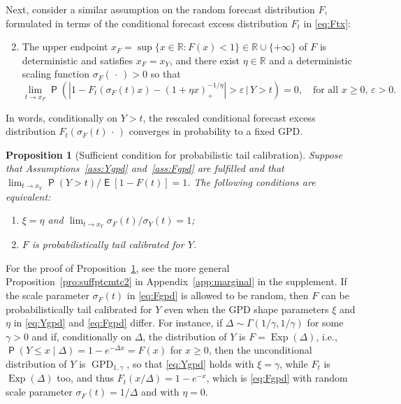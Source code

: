 \documentclass[12pt]{article}
\newcommand{\E}{\operatorname{\mathsf{E}}}
\newcommand{\Q}{\operatorname{\mathsf{P}}}
\newcommand{\R}{\mathbb{R}}
\newcommand{\GPD}{\operatorname{GPD}} %
\newcommand{\Exp}{\operatorname{Exp}} %
\newcommand{\point}{\,\cdot\,} %
\newcommand{\1}{\mathbf{1}} %
\newcommand{\eps}{\varepsilon}
\newtheorem{propo}{Proposition}
\theoremstyle{definition}
\begin{document}
    Next, consider a similar assumption on the random forecast distribution $F$, formulated in terms of the conditional forecast excess distribution $F_t$ in \eqref{eq:Ftx}: 
\begin{enumerate}[label=(A\arabic*)]
  \setcounter{enumi}{1}
\item \label{ass:Fgpd}
	The upper endpoint $x_F = \sup \{ x \in \R : F(x) < 1 \} \in \R \cup \{+\infty\}$ of $F$ is deterministic and satisfies $x_F = x_Y$, and there exist $\eta \in \R$ and a deterministic scaling function $\sigma_F(\,\cdot\,) > 0$ so that
	\begin{equation}
	\label{eq:Fgpd}
		\lim_{t \to x_F}
		\Q \left( 
			\left| 
				1 - F_t(\sigma_F(t)x) 
				- (1 + \eta x)_+^{-1/\eta} 
			\right| 
			> \eps 
			\, \Big| \, 
			Y > t
		\right)
		= 0, \quad \text{for all $x \ge 0$, $\eps > 0$}.
	\end{equation}
\end{enumerate}
	In words, conditionally on $Y > t$, the rescaled conditional forecast excess distribution $F_t(\sigma_F(t)\point)$ converges in probability to a fixed GPD.


\begin{propo}[Sufficient condition for probabilistic tail calibration]
\label{pro:suffptcmtc}
	Suppose that Assumptions~\ref{ass:Ygpd} and~\ref{ass:Fgpd} are fulfilled and that $\lim_{t \to x_Y} \Q(Y > t) / \E[1 - F(t)] = 1$. The following conditions are equivalent:
	\begin{enumerate}[label=(\alph*)]
	\item $\xi = \eta$ and $\lim_{t \to x_Y} \sigma_F(t)/\sigma_Y(t) = 1$;
	\item $F$ is probabilistically tail calibrated for $Y$.
	\end{enumerate}
\end{propo}

For the proof of Proposition~\ref{pro:suffptcmtc}, see the more general Proposition~\ref{pro:suffptcmtc2} in Appendix~\ref{app:marginal} in the supplement.
If the scale parameter $\sigma_F(t)$ in \eqref{eq:Fgpd} is allowed to be random, then $F$ can be probabilistically tail calibrated for $Y$ even when the GPD shape parameters $\xi$ and $\eta$ in \eqref{eq:Ygpd} and \eqref{eq:Fgpd} differ. For instance, if $\Delta \sim \Gamma(1/\gamma,1/\gamma)$ for some $\gamma > 0$ and if, conditionally on $\Delta$, the distribution of $Y$ is $F = \Exp(\Delta)$, i.e., $\Q(Y \le x \mid \Delta) = 1-e^{-\Delta x} = F(x)$ for $x \ge 0$, then the unconditional distribution of $Y$ is $\GPD_{1,\gamma}$, so that \eqref{eq:Ygpd} holds with $\xi = \gamma$, while $F_t$ is $\Exp(\Delta)$ too, and thus $F_t(x/\Delta) = 1 - e^{-x}$, which is \eqref{eq:Fgpd} with random scale parameter $\sigma_F(t) = 1/\Delta$ and with $\eta = 0$.
\end{document}

